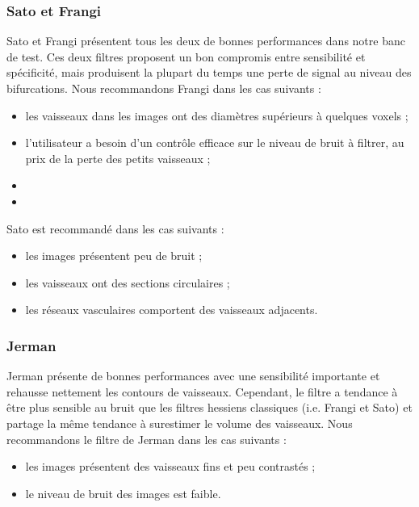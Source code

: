\subsubsection{Sato et Frangi}
Sato et Frangi présentent tous les deux de bonnes performances dans notre banc de test. Ces deux filtres proposent un bon compromis entre sensibilité et spécificité, mais produisent la plupart du temps une perte de signal au niveau des bifurcations. Nous recommandons Frangi dans les cas suivants :
\begin{itemize}
  \item les vaisseaux dans les images ont des diamètres supérieurs à quelques voxels ;
  \item l'utilisateur a besoin d'un contrôle efficace sur le niveau de bruit à filtrer, au prix de la perte des petits vaisseaux ;
  \item {}
  \item {}
\end{itemize}
Sato est recommandé dans les cas suivants :
\begin{itemize}
  \item les images présentent peu de bruit ;
  \item les vaisseaux ont des sections circulaires ;
  \item les réseaux vasculaires comportent des vaisseaux adjacents.
\end{itemize}
\subsubsection*{Jerman}
Jerman présente de bonnes performances avec une sensibilité importante et rehausse nettement les contours de vaisseaux. Cependant, le filtre a tendance à être plus sensible au bruit que les filtres hessiens classiques (i.e. Frangi et Sato) et partage la même tendance à surestimer le volume des vaisseaux. Nous recommandons le filtre de Jerman dans les cas suivants : 
\begin{itemize}
\item les images présentent des vaisseaux fins et peu contrastés ;
\item le niveau de bruit des images est faible.
\end{itemize}
